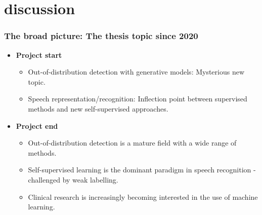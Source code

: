 
\section{discussion}






\begin{frame}
    \frametitle{The broad picture: The thesis topic since 2020}
    \begin{itemize}
        \item <1-> [2020] \textbf{Project start}
        \begin{itemize} 
            \item <1-> Out-of-distribution detection with generative models: Mysterious new topic.
            \item <1-> Speech representation/recognition: Inflection point between supervised methods and new self-supervised approaches.
        \end{itemize}
        \item <2-> [2024] \textbf{Project end}
        \begin{itemize}
            \item <2-> Out-of-distribution detection is a mature field with a wide range of methods.
            \item <2-> Self-supervised learning is the dominant paradigm in speech recognition - challenged by weak labelling.
            \item <3-> Clinical research is increasingly becoming interested in the use of machine learning.
        \end{itemize}
    \end{itemize}
\end{frame}


